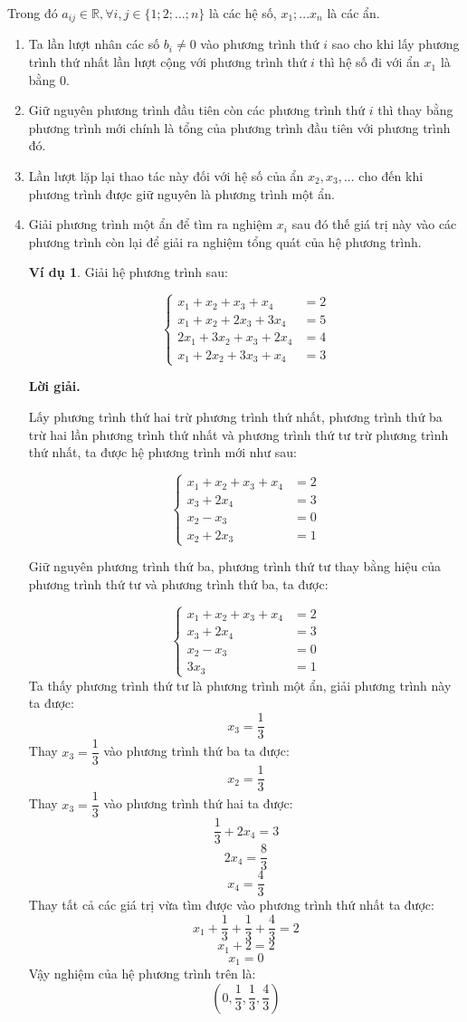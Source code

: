 \documentclass[12pt,a4paper,oneside]{book}
\theoremstyle{theorem}
\theoremstyle{definition}
\newtheorem{vd}[theorem2]{Ví dụ}
\begin{document}
Trong đó $a_{ij} \in \mathbb{R}, \forall i, j \in \{1; 2;...;n\}$ là các hệ số, $x_1;...x_n$ là các ẩn.
       \begin{enumerate}
       
             \item Ta lần lượt nhân các số $b_i\neq0$ vào phương trình thứ $i$ sao cho khi lấy phương trình thứ nhất lần lượt cộng với phương trình thứ $i$ thì hệ số đi với ẩn $x_1$ là bằng 0.
             \item Giữ nguyên phương trình đầu tiên còn các phương trình thứ $i$ thì thay bằng phương trình mới chính là tổng của phương trình đầu tiên với phương trình đó.
             \item Lần lượt lặp lại thao tác này đối với hệ số của ẩn $x_2,x_3,...$ cho đến khi phương trình được giữ nguyên là phương trình một ẩn.
             \item Giải phương trình một ẩn để tìm ra nghiệm $x_i$ sau đó thế giá trị này vào các phương trình còn lại để giải ra nghiệm tổng quát của hệ phương trình.

             \begin{vd} Giải hệ phương trình sau:

\[
\left\{
\begin{aligned}
x_1+x_2+x_3+x_4 &= 2\\
x_1+x_2+2x_3+3x_4 &= 5\\
2x_1+3x_2+x_3+2x_4 &= 4\\
x_1+2x_2+3x_3+x_4 &= 3
\end{aligned}
\right.
\]

\textbf{Lời giải.}

Lấy phương trình thứ hai trừ phương trình thứ nhất, phương trình thứ ba trừ hai lần phương trình thứ nhất và phương trình thứ tư trừ phương trình thứ nhất, ta được hệ phương trình mới như sau:

\[
\left\{
\begin{aligned}
x_1+x_2+x_3+x_4 &= 2\\
x_3+2x_4 &= 3\\
x_2-x_3 &= 0\\
x_2+2x_3 &= 1
\end{aligned}
\right.
\]

Giữ nguyên phương trình thứ ba, phương trình thứ tư thay bằng hiệu của phương trình thứ tư và phương trình thứ ba, ta được:

\[
\left\{
\begin{aligned}
x_1+x_2+x_3+x_4 &= 2\\
x_3+2x_4 &= 3\\
x_2-x_3 &= 0\\
3x_3 &= 1
\end{aligned}
\right.
\]
Ta thấy phương trình thứ tư là phương trình một ẩn, giải phương trình này ta được:
\[
x_3=\frac13
\]
Thay \(x_3=\dfrac13\) vào phương trình thứ ba ta được:
\[
x_2=\frac13
\]
Thay \(x_3=\dfrac13\) vào phương trình thứ hai ta được:
\[
\frac13+2x_4=3
\]
\[
2x_4=\frac83
\]
\[
x_4=\frac43
\]
Thay tất cả các giá trị vừa tìm được vào phương trình thứ nhất ta được:
\[
x_1+\frac13+\frac13+\frac43=2
\]
\[
x_1+2=2
\]
\[
x_1=0
\]
Vậy nghiệm của hệ phương trình trên là:
\[
\boxed{\left(0,\frac13,\frac13,\frac43\right)}
\]
             

\end{vd}
\end{enumerate}
\end{document}
